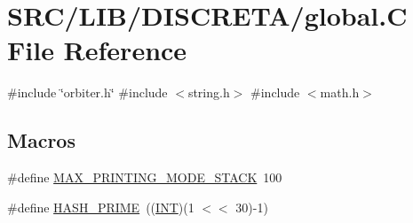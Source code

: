 \hypertarget{global_8_c}{}\section{S\+R\+C/\+L\+I\+B/\+D\+I\+S\+C\+R\+E\+T\+A/global.C File Reference}
\label{global_8_c}
{\ttfamily \#include \char`\"{}orbiter.\+h\char`\"{}}\newline
{\ttfamily \#include $<$string.\+h$>$}\newline
{\ttfamily \#include $<$math.\+h$>$}\newline
\subsection*{Macros}
\begin{DoxyCompactItemize}
\item 
\#define \mbox{\hyperlink{global_8_c_a2b2878d25a24b7d830661fb7de3675db}{M\+A\+X\+\_\+\+P\+R\+I\+N\+T\+I\+N\+G\+\_\+\+M\+O\+D\+E\+\_\+\+S\+T\+A\+CK}}~100
\item 
\#define \mbox{\hyperlink{global_8_c_a3340643b9fb0a58333f04e75ff897e03}{H\+A\+S\+H\+\_\+\+P\+R\+I\+ME}}~((\mbox{\hyperlink{galois_8h_a09fddde158a3a20bd2dcadb609de11dc}{I\+NT}})(1 $<$$<$ 30)-\/1)
\end{DoxyCompactItemize}
